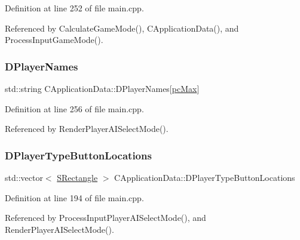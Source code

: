 Definition at line 252 of file main.\+cpp.



Referenced by Calculate\+Game\+Mode(), C\+Application\+Data(), and Process\+Input\+Game\+Mode().

\hypertarget{classCApplicationData_a446d88c378b95b1a4f88071612229086}{}\label{classCApplicationData_a446d88c378b95b1a4f88071612229086} 
\subsubsection{\texorpdfstring{D\+Player\+Names}{DPlayerNames}}
{\footnotesize\ttfamily std\+::string C\+Application\+Data\+::\+D\+Player\+Names\mbox{[}\hyperlink{GameDataTypes_8h_aafb0ca75933357ff28a6d7efbdd7602fa594a5c8dd3987f24e8a0f23f1a72cd34}{pc\+Max}\mbox{]}\hspace{0.3cm}{\ttfamily [protected]}}



Definition at line 256 of file main.\+cpp.



Referenced by Render\+Player\+A\+I\+Select\+Mode().

\hypertarget{classCApplicationData_a49d2ad6ab469e18577716ac993b475cb}{}\label{classCApplicationData_a49d2ad6ab469e18577716ac993b475cb} 
\subsubsection{\texorpdfstring{D\+Player\+Type\+Button\+Locations}{DPlayerTypeButtonLocations}}
{\footnotesize\ttfamily std\+::vector$<$ \hyperlink{structSRectangle}{S\+Rectangle} $>$ C\+Application\+Data\+::\+D\+Player\+Type\+Button\+Locations\hspace{0.3cm}{\ttfamily [protected]}}



Definition at line 194 of file main.\+cpp.



Referenced by Process\+Input\+Player\+A\+I\+Select\+Mode(), and Render\+Player\+A\+I\+Select\+Mode().

